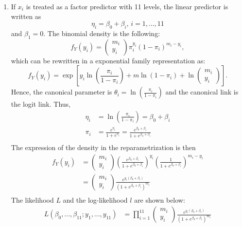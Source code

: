 \begin{solution}{5.9}
\begin{enumerate}
\item If $x_{i}$ is treated as a factor predictor with 11 levels, the linear predictor is written as $$\eta_{i}=\beta_{0}+\beta_{i} \mbox{,  } i=1,...,11$$ and $\beta_{1}=0$. The binomial density is the following: $$f_{Y}(y_{i})=\begin{pmatrix} m_{i} \\ y_{i} \end{pmatrix}\pi_{i}^{y_{i}}(1-\pi_{i})^{m_{i}-y_{i}},$$ which can be rewritten in a exponential family representation as: $$f_{Y}(y_{i})=\exp\left[y_{i}\ln\left(\frac{\pi_{i}}{1-\pi_{i}}\right)+m\ln(1-\pi_{i})+\ln\begin{pmatrix} m_{i} \\ y_{i} \end{pmatrix}\right].$$ Hence, the canonical parameter is $\theta_{i}=\ln\left(\frac{\pi_{i}}{1-\pi_{i}}\right)$ and the canonical link is the logit link. Thus,
\begin{align*}
\eta_{i}&=\ln\left(\frac{\pi_{i}}{1-\pi_{i}}\right)=\beta_{0}+\beta_{i} \\
\pi_{i}&=\frac{e^{\eta_{i}}}{1+e^{\eta_{i}}}= \frac{e^{\beta_{0}+\beta_{i}}}{1+e^{\beta_{0}+\beta_{i}}}\\
\end{align*}
The expression of the density in the reparametrization is then
\begin{align*}
f_{Y}(y_{i})&=\begin{pmatrix} m_{i} \\ y_{i} \end{pmatrix}\left(\frac{e^{\beta_{0}+\beta_{i}}}{1+e^{\beta_{0}+\beta_{i}}}\right)^{y_{i}}\left(\frac{1}{1+e^{\beta_{0}+\beta_{i}}}\right)^{m_{i}-y_{i}}\\
&=\begin{pmatrix} m_{i} \\ y_{i} \end{pmatrix}\frac{e^{y_{i}(\beta_{0}+\beta_{i})}}{(1+e^{\beta_{0}+\beta_{i}})^{m_{i}}}\\
\end{align*} The likelihood $L$ and the log-likelihood $l$ are shown below:
\begin{align*}
L(\beta_{0},...,\beta_{11};y_{1},...,y_{11})&=\prod_{i=1}^{11} \begin{pmatrix} m_{i} \\ y_{i} \end{pmatrix}\frac{e^{y_{i}(\beta_{0}+\beta_{i})}}{(1+e^{\beta_{0}+\beta_{i}})^{m_{i}}}\\

\end{align*}
\end{enumerate}
\end{solution}
